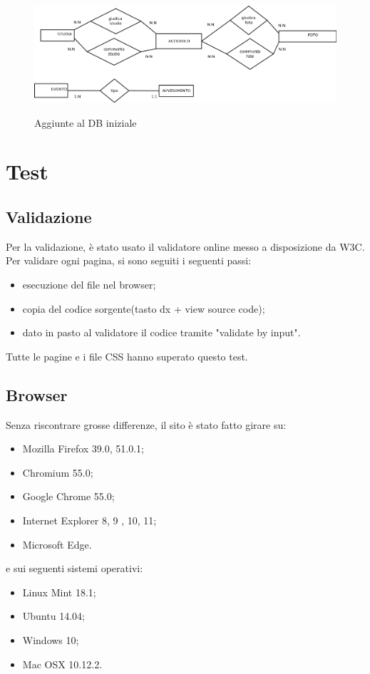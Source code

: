 	\begin{figure}
		\includegraphics[scale=0.35]{images/DBplus.png}\\[1cm] \caption{Aggiunte al DB iniziale}
	\end{figure}
	\newpage
	\section{Test}
	\subsection{Validazione}
	Per la validazione, è stato usato il validatore online messo a disposizione da W3C. Per validare ogni pagina, si sono seguiti i seguenti passi:
	\begin{itemize}
		\item esecuzione del file nel browser;
		\item copia del codice sorgente(tasto dx + view source code);
		\item dato in pasto al validatore il codice tramite "validate by input".
	\end{itemize}
	Tutte le pagine e i file CSS hanno superato questo test.
	\subsection{Browser}
	Senza riscontrare grosse differenze, il sito è stato fatto girare su:
	\begin{itemize}
		\item Mozilla Firefox 39.0, 51.0.1;
		\item Chromium 55.0;
		\item Google Chrome 55.0;
		\item Internet Explorer 8, 9 , 10, 11;
		\item Microsoft Edge.
	\end{itemize}
	e sui seguenti sistemi operativi:
	\begin{itemize}
		\item Linux Mint 18.1;
		\item Ubuntu 14.04;
		\item Windows 10;
		\item Mac OSX 10.12.2.
	\end{itemize}
